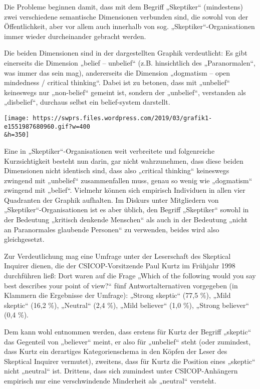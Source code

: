 Die Probleme beginnen damit, dass mit dem Begriff „Skeptiker``
(mindestens) zwei verschiedene semantische Dimensionen verbunden sind,
die sowohl von der Öffentlichkeit, aber vor allem auch innerhalb von
sog. „Skeptiker``-Organisationen immer wieder durcheinander gebracht
werden.

Die beiden Dimensionen sind in der dargestellten Graphik verdeutlicht:
Es gibt einerseits die Dimension „belief -- unbelief`` (z.B.
hinsichtlich des „Paranormalen``, was immer das sein mag), andererseits
die Dimension „dogmatism -- open mindedness / critical thinking``. Dabei
ist zu betonen, dass mit „unbelief`` keineswegs nur „non-belief``
gemeint ist, sondern der „unbelief``, verstanden als „disbelief``,
durchaus selbst ein belief-system darstellt.

\texttt{[image: https://swprs.files.wordpress.com/2019/03/grafik1-e1551987680960.gif?w=400\\\&h=350]}

Eine in „Skeptiker``-Organisationen weit verbreitete und folgenreiche
Kurzsichtigkeit besteht nun darin, gar nicht wahrzunehmen, dass diese
beiden Dimensionen nicht identisch sind, dass also „critical thinking``
keineswegs zwingend mit „unbelief`` zusammenfallen muss, genau so wenig
wie „dogmatism`` zwingend mit „belief``. Vielmehr können sich empirisch
Individuen in allen vier Quadranten der Graphik aufhalten. Im Diskurs
unter Mitgliedern von „Skeptiker``-Organisationen ist es aber üblich,
den Begriff „Skeptiker`` sowohl in der Bedeutung „kritisch denkende
Menschen`` als auch in der Bedeutung „nicht an Paranormales glaubende
Personen`` zu verwenden, beides wird also gleichgesetzt.

Zur Verdeutlichung mag eine Umfrage unter der Leserschaft des Skeptical
Inquirer dienen, die der CSICOP-Vorsitzende Paul Kurtz im Frühjahr 1998
durchführen ließ: Dort waren auf die Frage „Which of the following would
you say best describes your point of view?`` fünf Antwortalternativen
vorgegeben (in Klammern die Ergebnisse der Umfrage): „Strong skeptic``
(77,5 \%), „Mild skeptic`` (16,2 \%), „Neutral`` (2,4 \%), „Mild
believer`` (1,0 \%), „Strong believer`` (0,4 \%).

Dem kann wohl entnommen werden, dass erstens für Kurtz der Begriff
„skeptic`` das Gegenteil von „believer`` meint, er also für „unbelief``
steht (oder zumindest, dass Kurtz ein derartiges Kategorienschema in den
Köpfen der Leser des Skeptical Inquirer vermutet), zweitens, dass für
Kurtz die Position eines „skeptic`` nicht „neutral`` ist. Drittens, dass
sich zumindest unter CSICOP-Anhängern empirisch nur eine verschwindende
Minderheit als „neutral`` versteht.

